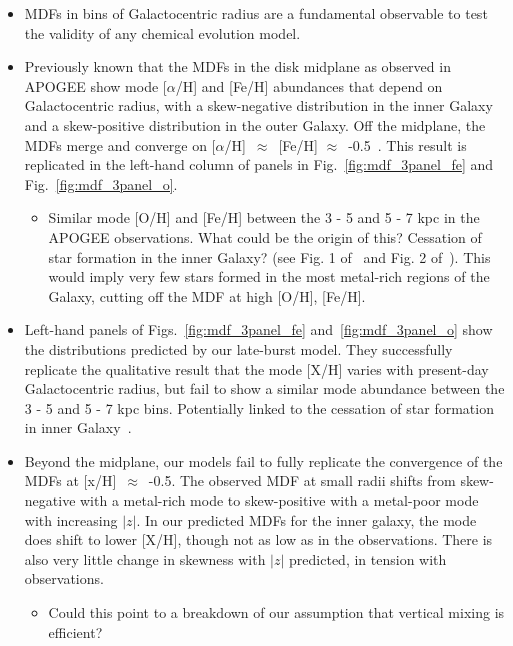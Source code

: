 \documentclass[a4paper, fleqn, usenatbib, useAMS]{mnras}
\begin{document}
\begin{itemize} 
	\item MDFs in bins of Galactocentric radius are a fundamental observable 
	to test the validity of any chemical evolution model. 

	\item Previously known that the MDFs in the disk midplane as observed in 
	APOGEE show mode [$\alpha$/H] and [Fe/H] abundances that depend on 
	Galactocentric radius, with a skew-negative distribution in the inner 
	Galaxy and a skew-positive distribution in the outer Galaxy. Off the 
	midplane, the MDFs merge and converge on [$\alpha$/H]~$\approx$~[Fe/H] 
	$\approx$~-0.5~\citep{Hayden2015, Weinberg2019}. This result is replicated 
	in the left-hand column of panels in Fig.~\ref{fig:mdf_3panel_fe} and 
	Fig.~\ref{fig:mdf_3panel_o}. 
	\begin{itemize} 
		\item Similar mode [O/H] and [Fe/H] between the 3 - 5 and 5 - 7 kpc in 
		the APOGEE observations. What could be the origin of this? Cessation of 
		star formation in the inner Galaxy? (see Fig. 1 of~\citealp{Peek2009} 
		and Fig. 2 of~\citealp{Fraternali2012}). This would imply very few 
		stars formed in the most metal-rich regions of the Galaxy, cutting off 
		the MDF at high [O/H], [Fe/H]. 
	\end{itemize} 

	\item Left-hand panels of Figs.~\ref{fig:mdf_3panel_fe} 
	and~\ref{fig:mdf_3panel_o} show the distributions predicted by our 
	late-burst model. They successfully replicate the qualitative result that 
	the mode [X/H] varies with present-day Galactocentric radius, but fail to 
	show a similar mode abundance between the 3 - 5 and 5 - 7 kpc bins. 
	Potentially linked to the cessation of star formation in inner 
	Galaxy~\citep{Peek2009, Fraternali2012}. 

	\item Beyond the midplane, our models fail to fully replicate the 
	convergence of the MDFs at [x/H]~$\approx$~-0.5. The observed MDF at small 
	radii shifts from skew-negative with a metal-rich mode to skew-positive 
	with a metal-poor mode with increasing $\left|z\right|$. In our predicted 
	MDFs for the inner galaxy, the mode does shift to lower [X/H], though not 
	as low as in the observations. There is also very little change in 
	skewness with $\left|z\right|$ predicted, in tension with observations. 
	\begin{itemize} 
		\item Could this point to a breakdown of our assumption that vertical 
		mixing is efficient? 


\end{itemize}
\end{itemize}
\end{document}
